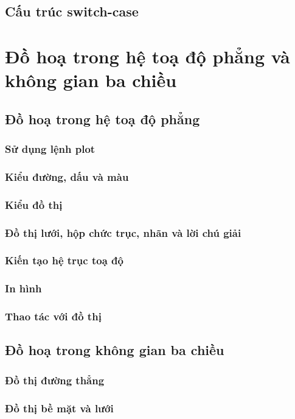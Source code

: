 \documentclass[12pt,a4paper]{article}
\begin{document}
\subsection{Cấu trúc switch-case}
\section{Đồ hoạ trong hệ toạ độ phẳng và không gian ba chiều}
\subsection{Đồ hoạ trong hệ toạ độ phẳng}
\subsubsection{Sử dụng lệnh plot}
\subsubsection{Kiểu đường, dấu và màu}
\subsubsection{Kiểu đồ thị}
\subsubsection{Đồ thị lưới, hộp chức trục, nhãn và lời chú giải}
\subsubsection{Kiến tạo hệ trục toạ độ}
\subsubsection{In hình}
\subsubsection{Thao tác với đồ thị}
\subsection{Đồ hoạ trong không gian ba chiều}
\subsubsection{Đồ thị đường thẳng}
\subsubsection{Đồ thị bề mặt và lưới}
\end{document}
